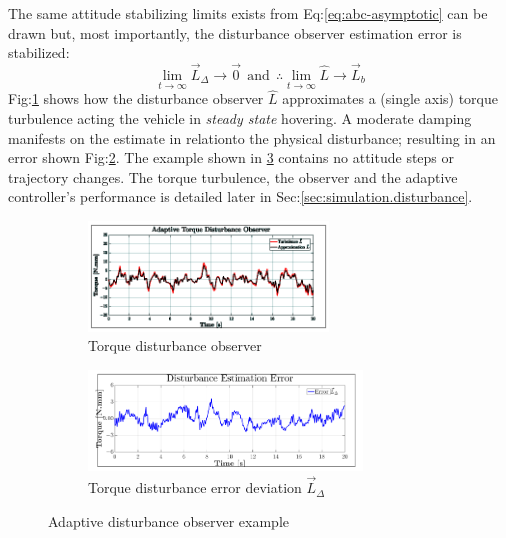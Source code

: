 {\begin{equation}
\end{equation}
The same attitude stabilizing limits exists from Eq:\ref{eq:abc-asymptotic} can be drawn but, most importantly, the disturbance observer estimation error is stabilized:
\begin{subequations}
\begin{equation}
\underset{t\rightarrow\infty}{\lim}\vec{L}_{\Delta}\rightarrow \vec{0}~~\text{and}~~
\therefore\underset{t\rightarrow\infty}{\lim}\hat{L}\rightarrow\vec{L}_b
\end{equation}
\end{subequations}
Fig:\ref{fig:disturbance_L} shows how the disturbance observer $\hat{L}$ approximates a (single axis) torque turbulence acting the vehicle in \emph{steady state} hovering. A moderate damping manifests on the estimate in relationto the physical disturbance; resulting in an error shown Fig:\ref{fig:error_LR}. The example shown in \ref{fig:example_L} contains no attitude steps or trajectory changes. The torque turbulence, the observer and the adaptive controller's performance is detailed later in Sec:\ref{sec:simulation.disturbance}.
\begin{figure}[hbtp]
\vspace{-6pt}
\centering
\begin{subfigure}{\textwidth}
\centering
\includegraphics[width=0.7\textwidth]{graphs/disturbance_L}
\vspace{-8pt}
\caption{Torque disturbance observer}
\label{fig:disturbance_L}
\end{subfigure}
\begin{subfigure}{\textwidth}
\centering
\includegraphics[width=0.8\textwidth]{graphs/error_LR}
\vspace{-8pt}
\caption{Torque disturbance error deviation $\vec{L}_\Delta$}
\label{fig:error_LR}
\end{subfigure}
\vspace{-6pt}
\caption{Adaptive disturbance observer example}
\label{fig:example_L}
\vspace{-25pt}
\end{figure}
}
